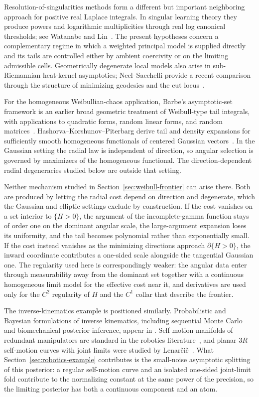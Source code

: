 \documentclass[11pt]{amsart}
\numberwithin{equation}{section}
\theoremstyle{definition}
\theoremstyle{remark}
\begin{document}
Resolution-of-singularities methods form a different but important neighboring
approach for positive real Laplace integrals.  In singular learning theory they
produce powers and logarithmic multiplicities through real log canonical
thresholds; see Watanabe and Lin~\cite{WatanabeAGSLT,LinRLCT}.  The present
hypotheses concern a complementary regime in which a weighted principal model
is supplied directly and its tails are controlled either by ambient coercivity
or on the limiting admissible cells.  Geometrically degenerate local models also arise in sub-Riemannian heat-kernel
asymptotics; Neel--Sacchelli provide a recent comparison through the structure
of minimizing geodesics and the cut locus~\cite{NeelSacchelli}.

For the homogeneous Weibullian-chaos application, Barbe's asymptotic-set
framework is an earlier broad geometric treatment of Weibull-type tail
integrals, with applications to quadratic forms, random linear forms, and
random matrices~\cite{BarbeAsymptoticSets}.  Hashorva--Korshunov--Piterbarg
derive tail and density expansions for sufficiently smooth homogeneous
functionals of centered Gaussian vectors~\cite{HashorvaKorshunovPiterbarg}.
In the Gaussian setting the radial law is independent of direction, so angular
selection is governed by maximizers of the homogeneous functional.  The
direction-dependent radial degeneracies studied below are outside that setting.

Neither mechanism studied in Section~\ref{sec:weibull-frontier} can arise there.
Both are produced by letting the radial cost depend on direction and degenerate,
which the Gaussian and elliptic settings exclude by construction.  If the cost
vanishes on a set interior to $\{H>0\}$, the argument of the incomplete-gamma
function stays of order one on the dominant angular scale, the large-argument
expansion loses its uniformity, and the tail becomes polynomial rather than
exponentially small.  If the cost instead vanishes as the minimizing directions
approach $\partial\{H>0\}$, the inward coordinate contributes a one-sided scale
alongside the tangential Gaussian one.  The regularity used here is
correspondingly weaker: the angular data enter through measurability away from
the dominant set together with a continuous homogeneous limit model for the
effective cost near it, and derivatives are used only for the $C^2$ regularity
of $H$ and the $C^1$ collar that describe the frontier.

The inverse-kinematics example is positioned similarly.  Probabilistic and
Bayesian formulations of inverse kinematics, including sequential Monte Carlo
and biomechanical posterior inference, appear in
\cite{CourtyArnaudSMCIK,PatakyBayesianIK}.  Self-motion manifolds of redundant
manipulators are standard in the robotics literature~\cite{BurdickSelfMotion},
and planar $3R$ self-motion curves with joint limits were studied by
Lenar\v{c}i\v{c}~\cite{Lenarcic3R}.  What Section~\ref{sec:robotics-example}
contributes is the small-noise asymptotic splitting of this posterior: a regular
self-motion curve and an isolated one-sided joint-limit fold contribute to the
normalizing constant at the same power of the precision, so the limiting
posterior has both a continuous component and an atom.
\end{document}

